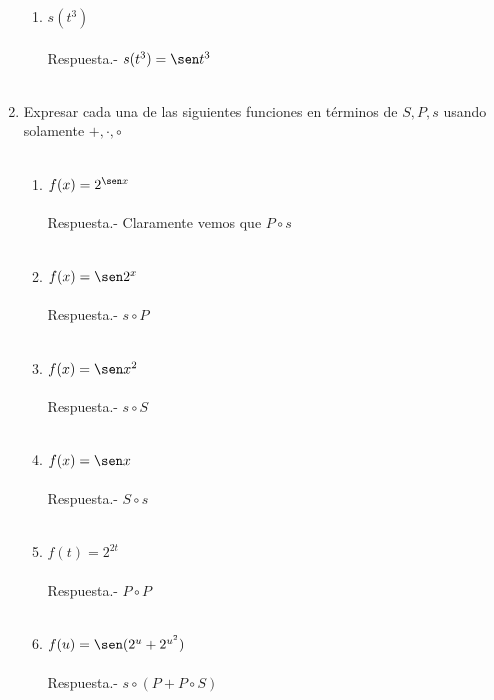 \begin{enumerate}[\bfseries 1.]
\begin{enumerate}[\bfseries (i)]
	    \item $s(t^3)$\\\\
	    Respuesta.- \; $s(t^3)=\sen t^3$\\\\

	\end{enumerate}

	\item Expresar cada una de las siguientes funciones en términos de $S,P,s$ usando solamente $+,\cdot , \circ$\\\\
	\begin{enumerate}[\bfseries (i)]
	    
	    \item $f(x)=2^{\sen x}$\\\\
	    Respuesta.- \; Claramente vemos que $P \circ s$\\\\ 

	    \item $f(x) = \sen 2^x$\\\\
	    Respuesta.- \; $s \circ P$\\\\

	    \item $f(x) = \sen x^2$\\\\
	    Respuesta.- \; $s \circ S$\\\\

	    \item $f(x) = \sen x$\\\\
	    Respuesta.- \; $S \circ s$\\\\

	    \item $f(t) = 2^{2t}$\\\\
	    Respuesta.- \; $P \circ P$\\\\

	    \item $f(u)=\sen (2^u + 2^{u^2})$\\\\
	    Respuesta.- \; $s \circ (P + P \circ S)$\\\\


\end{enumerate}
\end{enumerate}
